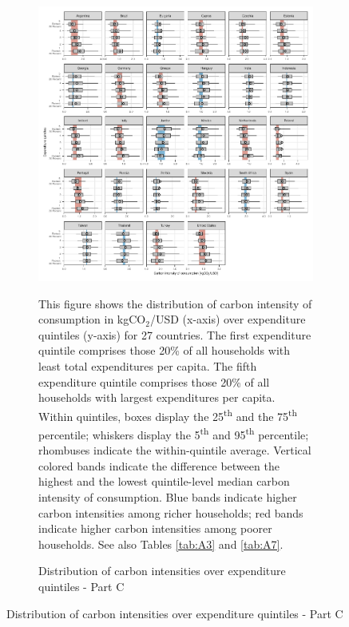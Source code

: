 \clearpage

\begin{figure}[ht!]\ContinuedFloat
   \begin{subfigure}[b]{\textwidth}
  \centering
  \includegraphics{1_Figures/Figures_Appendix/Figure_1_2017_Appendix_3.pdf}
  \caption{Distribution of carbon intensities over expenditure quintiles - Part C} \label{fig:Quint_C}
  \begin{subcaption2}
    This figure shows the distribution of carbon intensity of consumption in kgCO$_{2}$/USD (x-axis) over expenditure quintiles (y-axis) for 27 countries. The first expenditure quintile comprises those 20\% of all households with least total expenditures per capita. The fifth expenditure quintile comprises those 20\% of all households with largest expenditures per capita. Within quintiles, boxes display the 25\textsuperscript{th} and the 75\textsuperscript{th} percentile; whiskers display the 5\textsuperscript{th} and 95\textsuperscript{th} percentile; rhombuses indicate the within-quintile average. Vertical colored bands indicate the difference between the highest and the lowest quintile-level median carbon intensity of consumption. Blue bands indicate higher carbon intensities among richer households; red bands indicate higher carbon intensities among poorer households. See also Tables \ref{tab:A3} and \ref{tab:A7}.
  \end{subcaption2}
\end{subfigure}
\end{figure}